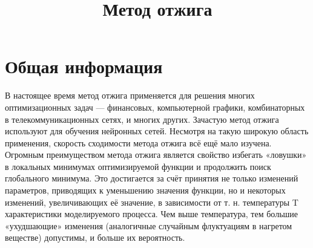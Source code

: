 
\usepackage[most]{tcolorbox}
\setlength{\parindent}{0pt}
\setlength{\parskip}{6pt}


\title{Метод отжига}
\maketitle
\section{Общая информация}
В настоящее время метод отжига применяется для решения многих оптимизационных задач — финансовых, компьютерной графики, комбинаторных в телекоммуникационных сетях, и многих других. Зачастую метод отжига используют для обучения нейронных сетей. Несмотря на такую широкую область применения, скорость сходимости метода отжига всё ещё мало изучена. \\
Огромным преимуществом метода отжига является свойство избегать «ловушки»\, в локальных минимумах оптимизируемой функции и продолжить поиск глобального минимума. Это достигается за счёт принятия не только изменений параметров, приводящих к уменьшению значения функции, но и некоторых изменений, увеличивающих её значение, в зависимости от т. н. температуры T характеристики моделируемого процесса. Чем выше температура, тем большие «ухудшающие» изменения (аналогичные случайным флуктуациям в нагретом веществе) допустимы, и больше их вероятность. 

